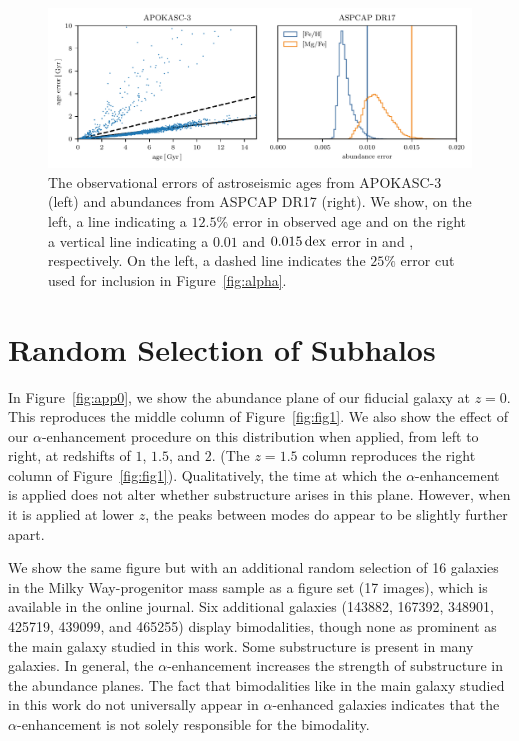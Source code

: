 \begin{appendices}
\begin{figure}
  \centering
  \includegraphics[width=\columnwidth]{ch4/obs_error.pdf}
  \caption{The observational errors of astroseismic ages from APOKASC-3 (left) and abundances from ASPCAP DR17 (right). We show, on the left, a line indicating a $12.5\%$ error in observed age and on the right a vertical line indicating a $0.01$ and $0.015\,\textrm{dex}$ error in \FeH{} and \MgFe{}, respectively. On the left, a dashed line indicates the $25\%$ error cut used for inclusion in Figure~\ref{fig:alpha}.}
  \label{fig:obs_err}
\end{figure}

\section{Random Selection of Subhalos}\label{ch4:app:rand_fig1}
In Figure~\ref{fig:app0}, we show the abundance plane of our fiducial galaxy at $z=0$. This reproduces the middle column of Figure~\ref{fig:fig1}. We also show the effect of our $\alpha$-enhancement procedure on this distribution when applied, from left to right, at redshifts of $1$, $1.5$, and $2$. (The $z=1.5$ column reproduces the right column of Figure~\ref{fig:fig1}). Qualitatively, the time at which the $\alpha$-enhancement is applied does not alter whether substructure arises in this plane. However, when it is applied at lower $z$, the peaks between modes do appear to be slightly further apart.

We show the same figure but with an additional random selection of 16 galaxies in the Milky Way-progenitor mass sample as a figure set (17 images), which is available in the online journal. Six additional galaxies (143882, 167392, 348901, 425719, 439099, and 465255) display bimodalities, though none as prominent as the main galaxy studied in this work. Some substructure is present in many galaxies. In general, the $\alpha$-enhancement increases the strength of substructure in the abundance planes. The fact that bimodalities like in the main galaxy studied in this work do not universally appear in $\alpha$-enhanced galaxies indicates that the $\alpha$-enhancement is not solely responsible for the bimodality.


\end{appendices}
